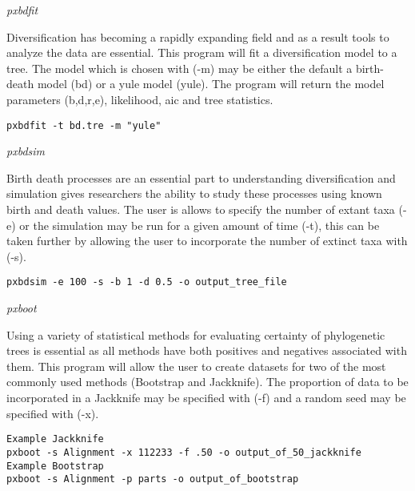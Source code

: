 \documentclass[12pt,letterpaper]{article}
\renewcommand{\subsection}[1]{%
\bigskip
\begin{center}
\begin{large}
\normalfont\itshape #1
\end{large}
\end{center}}
\begin{document}
\subsection{pxbdfit}

Diversification has becoming a rapidly expanding field and as a result tools to analyze the data are essential. This program will fit a diversification model to a tree. The model which is chosen with (-m) may be either the default a birth-death model (bd) or a yule model (yule). The program will return the model parameters (b,d,r,e), likelihood, aic and tree statistics.
\begin{flushleft}
\begin{verbatim}
pxbdfit -t bd.tre -m "yule"
\end{verbatim}
\end{flushleft}

\subsection{pxbdsim}

Birth death processes are an essential part to understanding diversification and simulation gives researchers the ability to study these processes using known birth and death values. The user is allows to specify the number of extant taxa (-e) or the simulation may be run for a given amount of time (-t), this can be taken further by allowing the user to incorporate the number of extinct taxa with (-s).

\begin{flushleft}
\begin{verbatim}
pxbdsim -e 100 -s -b 1 -d 0.5 -o output_tree_file
\end{verbatim}
\end{flushleft}

\subsection{pxboot}

Using a variety of statistical methods for evaluating certainty of phylogenetic trees is essential as all methods have both positives and negatives associated with them. This program will allow the user to create datasets for two of the most commonly used methods (Bootstrap and Jackknife). The proportion of data to be incorporated in a Jackknife may be specified with (-f) and a random seed may be specified with (-x).
\begin{flushleft}
\begin{verbatim}
Example Jackknife
pxboot -s Alignment -x 112233 -f .50 -o output_of_50_jackknife
Example Bootstrap
pxboot -s Alignment -p parts -o output_of_bootstrap
\end{verbatim}
\end{flushleft}
\end{document}
